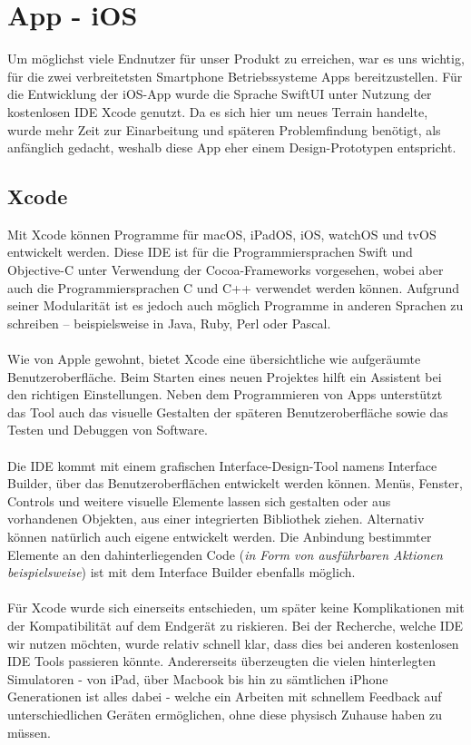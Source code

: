 \section{App - iOS}
Um möglichst viele Endnutzer für unser Produkt zu erreichen, war es uns wichtig, für die zwei verbreitetsten Smartphone Betriebssysteme Apps bereitzustellen. Für die Entwicklung der iOS-App wurde die Sprache SwiftUI unter Nutzung der  kostenlosen IDE Xcode genutzt.  Da es sich hier um neues Terrain handelte, wurde mehr Zeit zur Einarbeitung und späteren Problemfindung benötigt, als anfänglich gedacht, weshalb diese App eher einem Design-Prototypen entspricht. 

\subsection{Xcode}
Mit Xcode können Programme für macOS, iPadOS, iOS, watchOS und tvOS entwickelt werden. Diese IDE ist für die Programmiersprachen Swift und Objective-C unter Verwendung der Cocoa-Frameworks vorgesehen, wobei aber auch die Programmiersprachen C und C++ verwendet werden können. Aufgrund seiner Modularität ist es jedoch auch möglich Programme in anderen Sprachen zu schreiben – beispielsweise in Java, Ruby, Perl oder Pascal. \cite{Ahmad2020}
\\
\\
Wie von Apple gewohnt, bietet Xcode eine übersichtliche wie aufgeräumte Benutzeroberfläche. Beim Starten eines neuen Projektes hilft ein Assistent bei den richtigen Einstellungen. Neben dem Programmieren von Apps unterstützt das Tool auch das visuelle Gestalten der späteren Benutzeroberfläche sowie das Testen und Debuggen von Software. \cite{Ahmad2020}
\\
\\
Die IDE kommt mit einem grafischen Interface-Design-Tool namens Interface Builder, über das Benutzeroberflächen entwickelt werden können. Menüs, Fenster, Controls und weitere visuelle Elemente lassen sich gestalten oder aus vorhandenen Objekten, aus einer integrierten Bibliothek ziehen. Alternativ können natürlich auch eigene entwickelt werden. Die Anbindung bestimmter Elemente an den dahinterliegenden Code (\textit{in Form von ausführbaren Aktionen beispielsweise}) ist mit dem Interface Builder ebenfalls möglich.\cite{Ahmad2020}
\\
\\
Für Xcode wurde sich einerseits entschieden, um später keine Komplikationen mit der Kompatibilität auf dem Endgerät zu riskieren. Bei der Recherche, welche IDE wir nutzen möchten, wurde relativ schnell klar, dass dies bei anderen kostenlosen IDE Tools passieren könnte. Andererseits überzeugten die vielen hinterlegten Simulatoren - von iPad, über Macbook bis hin zu sämtlichen iPhone Generationen ist alles dabei - welche ein Arbeiten mit schnellem Feedback auf unterschiedlichen Geräten ermöglichen, ohne diese physisch Zuhause haben zu müssen.

